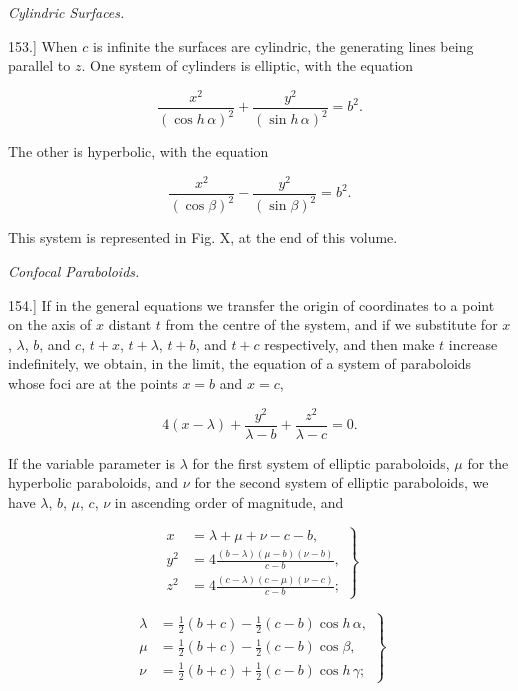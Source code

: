 \documentclass[11pt,a4paper]{article}
\begin{document}
{\centering\itshape Cylindric Surfaces.\par}

153.] When $c$ is infinite the surfaces are cylindric, the generating lines being parallel to $z$. One system of cylinders is elliptic, with the equation

\begin{equation}\tag{47}
\frac{x^2}{(\cos h\,\alpha)^2}
+\frac{y^2}{(\sin h\,\alpha)^2}=b^2.
\end{equation}

The other is hyperbolic, with the equation

\begin{equation}\tag{48}
\frac{x^2}{(\cos\beta)^2}-\frac{y^2}{(\sin\beta)^2}=b^2.
\end{equation}

This system is represented in Fig. X, at the end of this volume.

{\centering\itshape Confocal Paraboloids.\par}

154.] If in the general equations we transfer the origin of coordinates to a point on the axis of $x$ distant $t$ from the centre of the system, and if we substitute for $x$, $\lambda$, $b$, and $c$, $t+x$, $t+\lambda$, $t+b$, and $t+c$ respectively, and then make $t$ increase indefinitely, we obtain, in the limit, the equation of a system of paraboloids whose foci are at the points $x=b$ and $x=c$,

\begin{equation}\tag{49}
4(x-\lambda) + \frac{y^2}{\lambda - b} + \frac{z^2}{\lambda - c} = 0.
\end{equation}

If the variable parameter is $\lambda$ for the first system of elliptic paraboloids, $\mu$ for the hyperbolic paraboloids, and $\nu$ for the second system of elliptic paraboloids, we have $\lambda$, $b$, $\mu$, $c$, $\nu$ in ascending order of magnitude, and


\begin{equation}\tag{50}
\left.
\begin{aligned}
x&=\lambda+\mu+\nu-c-b,\\
y^2&=4\frac{(b-\lambda)(\mu-b)(\nu-b)}{c-b},\\
z^2&=4\frac{(c-\lambda)(c-\mu)(\nu-c)}{c-b};
\end{aligned}
\right\}
\end{equation}

\begin{equation}\tag{51}
\left.
\begin{aligned}
\lambda&=\frac12(b+c)-\frac12(c-b)\cos h\,\alpha,\\
\mu&=\frac12(b+c)-\frac12(c-b)\cos\beta,\\
\nu&=\frac12(b+c)+\frac12(c-b)\cos h\,\gamma;
\end{aligned}
\right\}
\end{equation}
\end{document}
